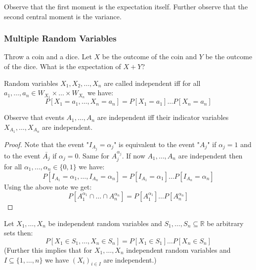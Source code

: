 \begin{remark}
    Observe that the first moment is the expectation itself. Further observe that the second central moment is the variance.
\end{remark}

\subsubsection{Multiple Random Variables}

\begin{example}
    Throw a coin and a dice. Let $X$ be the outcome of the coin and $Y$ be the outcome of the dice. What is the expectation of $X+Y$?
\end{example}

\begin{definition}
    Random variables $X_1, X_2, \dots, X_n$ are called independent iff for all $a_1, \dots, a_n \in W_{X_1} \times \dots \times W_{X_n}$ we have:
    $$P[X_1=a_1, \dots, X_n=a_n] = P[X_1=a_1] \dots P[X_n=a_n]$$
\end{definition}

\begin{lemma}
    Observe that events $A_1, \dots, A_n$ are independent iff their indicator variables $X_{A_1}, \dots, X_{A_n}$ are independent.
\end{lemma}

\begin{proof}
    Note that the event "$I_{A_j} = \alpha_j$" is equivalent to the event "$A_j$" if $\alpha_j = 1$ and to the event $\bar{A_j}$ if $\alpha_j = 0$. Same for $A_j^{\alpha_j}$.
    If now $A_1, \dots, A_n$ are independent then for all $\alpha_1, \dots, \alpha_n \in \{0,1\}$ we have:
    $$P[I_{A_1} = \alpha_1, \dots, I_{A_n} = \alpha_n] = P[I_{A_1} = \alpha_1] \dots P[I_{A_n} = \alpha_n]$$
    Using the above note we get:
    $$P[A_1^{\alpha_1} \cap \dots \cap A_n^{\alpha_n}] = P[A_1^{\alpha_1}] \dots P[A_n^{\alpha_n}]$$
\end{proof}

\begin{lemma}
    Let $X_1, \dots, X_n$ be independent random variables and $S_1, \dots, S_n \subseteq \mathbb{R}$ be arbitrary sets then:
    $$P[X_1 \in S_1, \dots, X_n \in S_n] = P[X_1 \in S_1] \dots P[X_n \in S_n]$$
    (Further this implies that for $X_1, \dots, X_n$ independent random variables and $I \subseteq \{1, \dots, n\}$ we have $(X_i)_{i \in I}$ are independent.)
\end{lemma}

